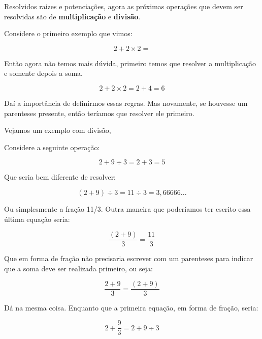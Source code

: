 \begin{tcolorbox}[title = Multiplicações e Divisões]
    Resolvidos raizes e potenciações, agora as próximas operações que devem ser resolvidas são de \textbf{multiplicação} e \textbf{divisão}.
\end{tcolorbox}

\begin{exemplo}
    Considere o primeiro exemplo que vimos:

    \begin{equation}
        2+2\times2=
    \end{equation}

    Então agora não temos mais dúvida, primeiro temos que resolver a multiplicação e somente depois a soma. 

    \begin{equation}
        2+2\times2 = 2+4 = 6
    \end{equation}

    Daí a importância de definirmos essas regras. Mas novamente, se houvesse um parenteses presente, então teríamos que resolver ele primeiro.
\end{exemplo}

Vejamos um exemplo com divisão,

\begin{exemplo}
    Considere a seguinte operação:

    \begin{equation}
        2+9\div3=2+3=5
    \end{equation}

    Que seria bem diferente de resolver:

    \begin{equation}
        (2+9)\div3=11\div3=3,66666...
    \end{equation}

    Ou simplesmente a fração 11/3. Outra maneira que poderíamos ter escrito essa última equação seria:

    \begin{equation}
        \frac{(2+9)}{3}=\frac{11}{3}
    \end{equation}

    Que em forma de fração não precisaria escrever com um parenteses para indicar que a soma deve ser realizada primeiro, ou seja:

    \begin{equation}
         \frac{2+9}{3}=\frac{(2+9)}{3}
    \end{equation}

    Dá na mesma coisa. Enquanto que a primeira equação, em forma de fração, seria:

    \begin{equation}
        2+\frac{9}{3}=2+9\div3
    \end{equation}
\end{exemplo}

